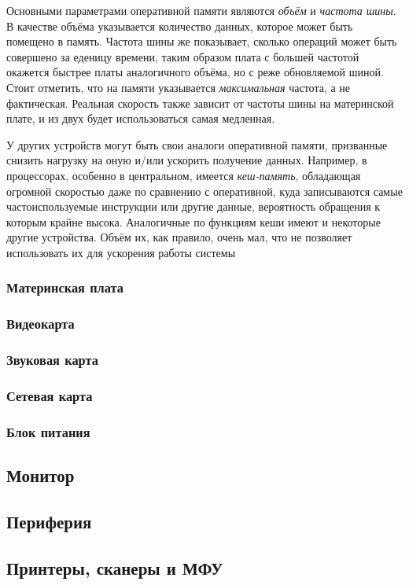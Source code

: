 Основными параметрами оперативной памяти являются \emph{объём} и \emph{частота шины}.
В качестве объёма указывается количество данных, которое может быть помещено в память.
Частота шины же показывает, сколько операций может быть совершено за еденицу времени, таким образом плата с большей частотой окажется быстрее платы аналогичного объёма, но с реже обновляемой шиной.
Стоит отметить, что на памяти указывается \emph{максимальная} частота, а не фактическая.
Реальная скорость также зависит от частоты шины на материнской плате, и из двух будет использоваться самая медленная.

У других устройств могут быть свои аналоги оперативной памяти, призванные снизить нагрузку на оную и/или ускорить получение данных.
Например, в процессорах, особенно в центральном, имеется \emph{кеш-память}, обладающая огромной скоростью даже по сравнению с оперативной, куда записываются самые частоиспользуемые инструкции или другие данные, вероятность обращения к которым крайне высока.
Аналогичные по функциям кеши имеют и некоторые другие устройства.
Объём их, как правило, очень мал, что не позволяет использовать их для ускорения работы системы

\subsubsection{Материнская плата}\label{base:introduction:components:motherboard}


\subsubsection{Видеокарта}\label{base:introduction:components:videocard}


\subsubsection{Звуковая карта}\label{base:introduction:components:soundcard}


\subsubsection{Сетевая карта}\label{base:introduction:components:nic}


\subsubsection{Блок питания}\label{base:introduction:components:psu}


\subsection{Монитор}\label{base:introduction:components:monitor}


\subsection{Периферия}\label{base:introduction:components:peripheral}


\subsection{Принтеры, сканеры и МФУ}\label{base:introduction:components:printers}

